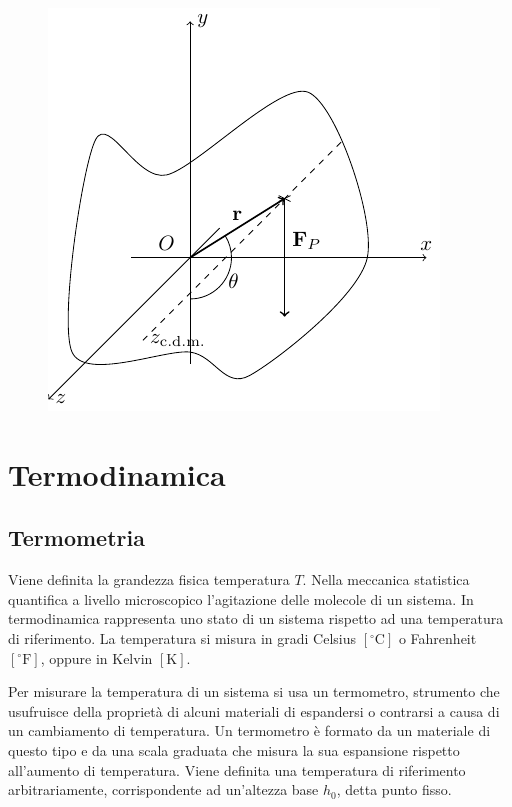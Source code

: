 \documentclass{article}
\numberwithin{equation}{subsection}
\begin{document}
\begin{figure}[H]%
    \centering
    \includegraphics{pendolo-fisico.pdf}%
\end{figure}

\clearpage

\section{Termodinamica}

\subsection{Termometria}
Viene definita la grandezza fisica temperatura $T$. Nella 
meccanica statistica 
quantifica a livello microscopico l'agitazione delle molecole 
di un sistema. In termodinamica rappresenta uno stato di un  
sistema rispetto ad una temperatura di riferimento. La 
temperatura si misura in gradi Celsius $\left[^{\circ}\mathrm{C}\right]$ o 
Fahrenheit $\left[^{\circ}\mathrm{F}\right]$, oppure in Kelvin $\left[\mathrm{K}\right]$. 



Per misurare la temperatura di un sistema si usa un termometro, 
strumento che usufruisce della proprietà di alcuni materiali di 
espandersi o contrarsi a causa di un cambiamento di temperatura.  
Un termometro è formato da un materiale di questo tipo e da una scala graduata che misura la sua 
espansione rispetto all'aumento di temperatura. Viene definita 
una temperatura di riferimento arbitrariamente, corrispondente 
ad un'altezza base $h_0$, detta punto fisso.
\end{document}
